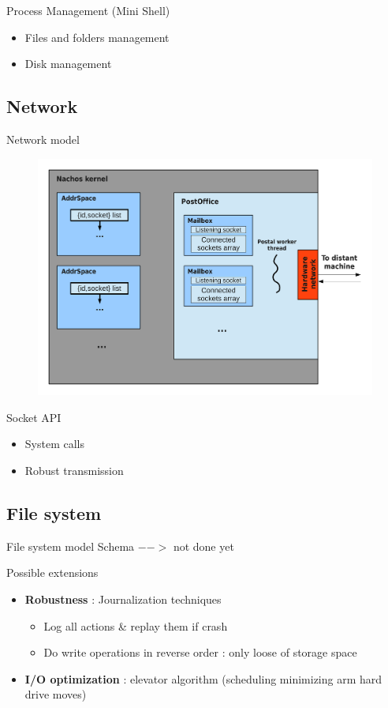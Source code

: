 \documentclass{beamer}
\begin{document}
\begin{frame}{Process Management (Mini Shell)}
    \begin{itemize}
        \item Files and folders management
        \item Disk management
    \end{itemize}
\end{frame}

\subsection{Network}
\begin{frame}{Network model}
    \begin{figure}[ht]
        \includegraphics[width=0.7\linewidth]{Networkcolored.pdf}
    \end{figure}
\end{frame}

\begin{frame}{Socket API}
    \begin{itemize}
        \item System calls  
        \item Robust transmission
    \end{itemize}
\end{frame}

\subsection{File system}
\begin{frame}{File system model}
    Schema $-->$ not done yet
\end{frame}

\begin{frame}{Possible extensions}
    \begin{itemize}
        \item \textbf{Robustness} : Journalization techniques
            \begin{itemize}
                \item Log all actions \& replay them if crash
                \item Do write operations in reverse order : only loose of
                    storage space
            \end{itemize}
        \item \textbf{I/O optimization} : elevator algorithm (scheduling minimizing arm
            hard drive moves)
    \end{itemize}
\end{frame}
\end{document}
